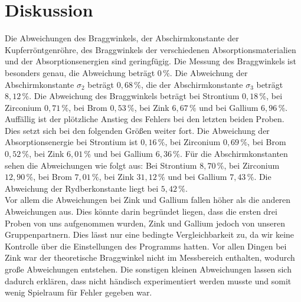 \section{Diskussion}
\label{sec:Diskussion}
Die Abweichungen des Braggwinkels, der Abschirmkonstante der Kupferröntgenröhre, des Braggwinkels der verschiedenen Absorptionsmaterialien und der 
Absorptionsenergien sind geringfügig. Die Messung des Braggwinkels ist besonders genau, die Abweichung beträgt $0 \,\%$. Die Abweichung der Abschirmkonstante $\sigma_2$ 
beträgt $0,68 \,\%$, die der Abschirmkonstante $\sigma_3$ beträgt $8,12 \,\%$. 
Die Abweichung des Braggwinkels beträgt bei Strontium $0,18 \,\%$, bei Zirconium $0,71 \,\%$, bei Brom $0,53 \,\%$, bei Zink $6,67 \,\%$ und bei Gallium $6,96 \,\%$. 
Auffällig ist der plötzliche Anstieg des Fehlers bei den letzten beiden Proben. Dies setzt sich bei den folgenden Größen weiter fort. Die Abweichung der
Absorptionsenergie bei Strontium ist $0,16 \,\%$, bei Zirconium $0,69 \,\%$, bei Brom $0,52 \,\%$, bei Zink $6,01 \,\%$ und bei Gallium $6,36 \,\%$. Für die Abschirmkonstanten sehen
die Abweichungen wie folgt aus: Bei Strontium  $8,70 \,\%$, bei Zirconium $12,90 \,\%$, bei Brom $7,01 \,\%$, bei Zink $31,12 \,\%$ und bei Gallium $7,43 \,\%$.
Die Abweichung der Rydberkonstante liegt bei $5,42 \,\%$. \\ 
Vor allem die Abweichungen bei Zink und Gallium fallen höher als die anderen Abweichungen aus. Dies könnte darin begründet liegen, dass die ersten drei Proben von 
uns aufgenommen wurden, Zink und Gallium jedoch von unseren Gruppenpartnern. Dies lässt nur eine bedingte Vergleichbarkeit zu, da wir keine Kontrolle über die 
Einstellungen des Programms hatten. 
Vor allen Dingen bei Zink war der theoretische Braggwinkel nicht im Messbereich enthalten, wodurch große Abweichungen entstehen. Die sonstigen kleinen Abweichungen 
lassen sich dadurch erklären, dass nicht händisch experimentiert werden musste und somit wenig Spielraum für Fehler gegeben war. 